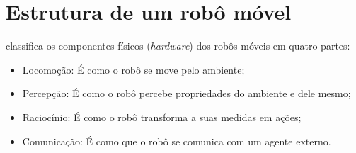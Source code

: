 \section{Estrutura de um robô móvel} \label{cap:sensores}




 classifica os componentes físicos (\textit{hardware}) dos robôs móveis em quatro partes:

\begin{itemize}
 \item Locomoção: É como o robô se move pelo ambiente; 
 
 \item Percepção: É como o robô percebe propriedades do ambiente e dele mesmo;
 
 \item Raciocínio: É como o robô transforma a suas medidas em ações;
 
 \item Comunicação: É como que o robô se comunica com um agente externo.
 
\end{itemize}


